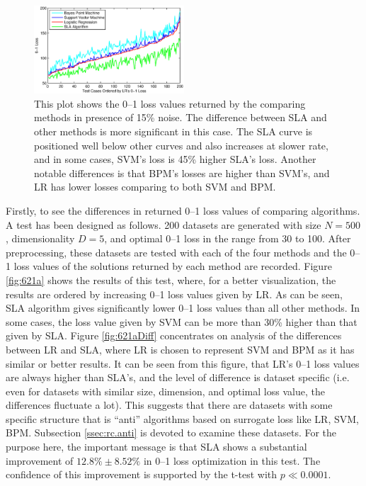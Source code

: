\begin{figure}[here]
\includegraphics[width=0.50\textwidth]{images/fig61_621b.eps}
\caption{
This plot shows the 0--1 loss values returned by the comparing methods in presence of 15\% noise. The difference between SLA and other methods is more significant in this case. The SLA curve is positioned well below other curves and also increases at slower rate, and in some cases, SVM's loss is 45\% higher SLA's loss. Another notable differences is that BPM's losses are higher than SVM's, and LR has lower losses comparing to both SVM and BPM. 
}
\label{fig:621b}
\end{figure}

Firstly, to see the differences in returned 0--1 loss values of comparing algorithms. A test has been designed as follows. 200 datasets are generated with size $N=500$, dimensionality $D=5$, and optimal 0--1 loss in the range from 30 to 100. After preprocessing, these datasets are tested with each of the four methods and the 0--1 loss values of the solutions returned by each method are recorded. Figure \ref{fig:621a} shows the results of this test, where, for a better visualization, the results are ordered by increasing 0--1 loss values given by LR. As can be seen, SLA algorithm gives significantly lower 0--1 loss values than all other methods. In some cases, the loss value given by SVM can be more than 30\% higher than that given by SLA. Figure \ref{fig:621aDiff} concentrates on analysis of the differences between LR and SLA, where LR is chosen to represent SVM and BPM as it has similar or better results. It can be seen from this figure, that LR's 0--1 loss values are always higher than SLA's, and the level of difference is dataset specific (i.e. even for datasets with similar size, dimension, and optimal loss value, the differences fluctuate a lot). This suggests that there are datasets with some specific structure that is ``anti'' algorithms based on surrogate loss like LR, SVM, BPM. Subsection \ref{ssec:rc.anti} is devoted to examine these datasets. For the purpose here, the important message is that SLA shows a substantial improvement of $12.8\% \pm 8.52\%$ in 0--1 loss optimization in this test. The confidence of this improvement is supported by the t-test with $p \ll 0.0001$.

